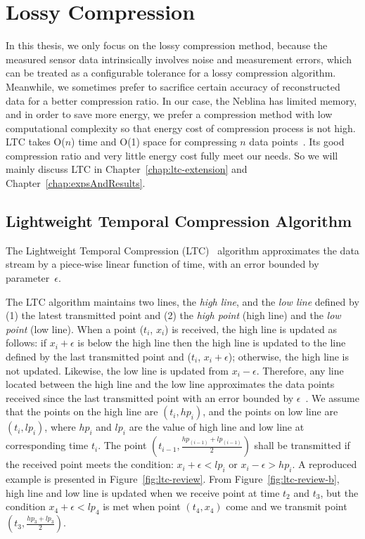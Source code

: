 \section{Lossy Compression}
\label{sec:lossy}

In this thesis, we only focus on the lossy compression method, because  the
measured sensor data intrinsically involves noise and measurement errors, which
can be treated as a configurable tolerance for a lossy compression algorithm.
Meanwhile, we sometimes prefer to sacrifice certain accuracy of reconstructed
data for a better compression ratio. In our case, the Neblina has limited
memory, and in order to save more energy, we prefer a compression method with
low computational complexity so that energy cost of compression process is not
high. LTC takes O($n$) time and O(1) space for compressing $n$ data
points~\cite{schoellhammer2004lightweight}. Its good compression ratio and very
little energy cost fully meet our needs. So we will mainly discuss LTC in
Chapter~\ref{chap:ltc-extension} and Chapter~\ref{chap:expsAndResults}.

\subsection{Lightweight Temporal Compression Algorithm}
\label{sec:ltc}

The Lightweight Temporal Compression (LTC)~\cite{schoellhammer2004lightweight}
algorithm approximates the data stream by a piece-wise linear function of time,
with an error bounded by parameter~$\epsilon$.

The LTC algorithm maintains two lines, the \emph{high line}, and the \emph{low
line} defined by (1) the latest transmitted point and (2) the \emph{high point}
(high line) and the \emph{low point} (low line). When a point ($t_i$, $x_i$) is
received, the high line is updated as follows: if $x_i+\epsilon$ is below the
high line then the high line is updated to the line defined by the last
transmitted point and ($t_i$, $x_i+\epsilon$); otherwise, the high line is not
updated. Likewise, the low line is updated from $x_i-\epsilon$. Therefore, any
line located between the high line and the low line approximates the data points
received since the last transmitted point with an error bounded by
$\epsilon$~\cite{schoellhammer2004lightweight}. We assume that the points on the high
line are $(t_i, hp_i)$, and the points on low line are $(t_i, lp_i)$, where
$hp_i$ and $lp_i$ are the value of high line and low line at corresponding time
$t_i$.
The point $(t_{i-1}, \frac{hp_{(i-1)}+lp_{(i-1)}}{2})$ shall be transmitted if the
received point meets the condition: $x_i+\epsilon < lp_{i}$ or $x_i-\epsilon >
hp_{i}$. A reproduced example is presented in Figure~\ref{fig:ltc-review}. From
Figure~\ref{fig:ltc-review-b}, high line and low line is updated
when we receive point at time $t_2$ and $t_3$, but the condition $x_4+\epsilon <
lp_{4}$ is met when point $(t_4, x_4)$ come and we transmit point $(t_3,
\frac{hp_{3}+lp_{3}}{2})$. 

